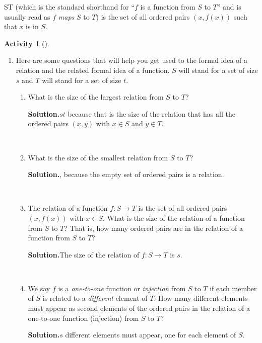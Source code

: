 \documentclass[10pt,]{book}
\theoremstyle{plain}
\theoremstyle{definition}
\newtheorem{activity}[project]{Activity}
\numberwithin{equation}{chapter}
\begin{document}
S\rightarrow T\) (which is the standard shorthand for ``\(f\) is a function from \(S\) to \(T\)'' and is usually read as \(f\) \emph{maps} \(S\) to \(T\)) is the set of all ordered pairs \((x,f(x))\) such that \(x\) is in \(S\).%
\begin{activity}[]\label{formalrelations}
~\par
\begin{enumerate}[label=(\alph*)]
 \item Here are some questions that will help you get used to the formal idea of a relation and the related formal idea of a function. \(S\) will stand for a set of size \(s\) and \(T\) will stand for a set of size \(t\).%
~\par
\begin{enumerate}[label=(\alph*)]
 \item What is the size of the largest relation from \(S\) to \(T\)?%
\par\medskip\noindent%
\textbf{Solution.}\quad \(st\) because that is the size of the relation that has all the ordered pairs \((x,y)\) with \(x\in S\) and \(y\in T\).%

~\par
\item What is the size of the smallest relation from \(S\) to \(T\)?%
\par\medskip\noindent%
\textbf{Solution.}, because the empty set of ordered pairs is a relation.%

~\par
\item The relation of a function \(f:S\rightarrow T\) is the set of all ordered pairs \((x,f(x))\) with \(x\in S\).  What is the size of the relation of a function from \(S\) to \(T\)?  That is, how many ordered pairs are in the relation of a function from \(S\) to \(T\)?%
\par\medskip\noindent%
\textbf{Solution.}\quad The size of the relation of \(f:S\rightarrow T\) is \(s\).%

~\par
\item We say \(f\) is a \emph{one-to-one} function or \emph{injection} from \(S\) to \(T\) if each member of \(S\) is related to a \emph{different} element of \(T\). How many different elements must appear as second elements of the ordered pairs in the relation of a one-to-one function (injection) from \(S\) to \(T\)?%
\par\medskip\noindent%
\textbf{Solution.}\quad \(s\) different elements must appear, one for each element of \(S\).%


\end{enumerate}
\end{enumerate}
\end{activity}
\end{document}
